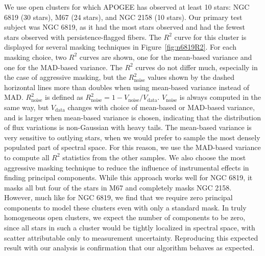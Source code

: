 \documentclass[a4paper,fleqn,usenatbib]{mnras}
\newcommand       \Rsq      {{R^2}}
\newcommand       \Rnoise   {{R^2_{\mathrm{noise}}}}
\begin{document}
We use open clusters for which APOGEE has observed at least 10 stars: NGC 6819 (30 stars), M67 (24 stars), and NGC 2158 (10 stars). Our primary test subject was NGC 6819, as it had the most stars observed and had the fewest stars observed with persistence-flagged fibers. The $\Rsq$ curve for this cluster is displayed for several masking techniques in Figure~\ref{fig:n6819R2}. For each masking choice, two $\Rsq$ curves are shown, one for the mean-based variance and one for the MAD-based variance. The $\Rsq$ curves do not differ much, especially in the case of aggressive masking, but the $\Rnoise$ values shown by the dashed horizontal lines more than doubles when using mean-based variance instead of MAD. $\Rnoise$ is defined as $\Rnoise = 1-V_{\mathrm{noise}}/V_{\mathrm{data}}$. $V_{\mathrm{noise}}$ is always computed in the same way, but $V_{\mathrm{data}}$ changes with choice of mean-based or MAD-based variance, and is larger when mean-based variance is chosen, indicating that the distribution of flux variations is non-Gaussian with heavy tails. The mean-based variance is very sensitive to outlying stars, when we would prefer to sample the most densely populated part of spectral space. For this reason, we use the MAD-based variance to compute all $\Rsq$ statistics from the other samples. We also choose the most aggressive masking technique to reduce the influence of instrumental effects in finding principal components. While this approach works well for NGC 6819, it masks all but four of the stars in M67 and completely masks NGC 2158. However, much like for NGC 6819, we find that we require zero principal components to model these clusters even with only a standard mask. In truly homogeneous open clusters, we expect the number of components to be zero, since all stars in such a cluster would be tightly localized in spectral space, with scatter attributable only to measurement uncertainty. Reproducing this expected result with our analysis is confirmation that our algorithm behaves as expected.
\end{document}
